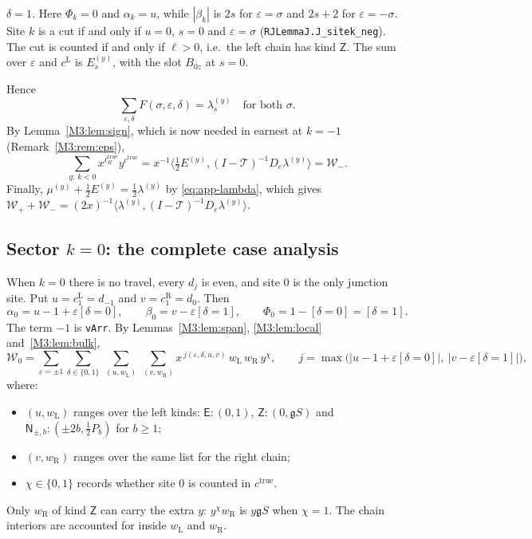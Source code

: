 \documentclass[11pt]{article}
\theoremstyle{plain}
\theoremstyle{definition}
\theoremstyle{remark}
\begin{document}
\emph{$\delta=1$.} Here $\Phi_k=0$ and $\alpha_k=u$, while $|\beta_k|$ is $2s$ for
$\varepsilon=\sigma$ and $2s+2$ for $\varepsilon=-\sigma$. Site $k$ is a cut if and only if
$u=0$, $s=0$ and $\varepsilon=\sigma$ (\texttt{RJLemmaJ.J\_sitek\_neg}). The cut is counted
if and only if $\ell>0$, i.e.\ the left chain has kind $\mathsf Z$. The sum over
$\varepsilon$ and $c^{\mathrm L}$ is $E^{(y)}_s$, with the slot $B_{0z}$ at $s=0$.

Hence
\begin{equation}\label{eq:app-k-far}
  \sum_{\varepsilon,\delta}F(\sigma,\varepsilon,\delta)=\lambda^{(y)}_s\quad\text{for both }\sigma .
\end{equation}
By Lemma~\ref{M3:lem:sign}, which is now needed in earnest at $k=-1$ (Remark~\ref{M3:rem:eps}),
\[
  \sum_{g:\,k<0}x^{\ell_R^{\mathrm{true}}}y^{c^{\mathrm{true}}}
  =x^{-1}\bigl\langle\tfrac12E^{(y)},(I-\mathcal T)^{-1}D_e\lambda^{(y)}\bigr\rangle=\mathcal W_- .
\]
Finally, $\mu^{(y)}+\tfrac12E^{(y)}=\tfrac12\lambda^{(y)}$ by \eqref{eq:app-lambda}, which gives
$\mathcal W_++\mathcal W_-=(2x)^{-1}\langle\lambda^{(y)},(I-\mathcal T)^{-1}D_e\lambda^{(y)}\rangle$.

\subsection{Sector $k=0$: the complete case analysis}\label{app:k0}

When $k=0$ there is no travel, every $d_j$ is even, and site $0$ is the only junction site.
Put $u=c^{\mathrm L}_1=d_{-1}$ and $v=c^{\mathrm R}_1=d_0$. Then
\[
  \alpha_0=u-1+\varepsilon[\delta=0],\qquad \beta_0=v-\varepsilon[\delta=1],\qquad
  \Phi_0=1-[\delta=0]=[\delta=1].
\]
The term $-1$ is \texttt{vArr}. By Lemmas~\ref{M3:lem:span}, \ref{M3:lem:local} and~\ref{M3:lem:bulk},
\begin{equation}\label{eq:app-W0}
  \mathcal W_0=\sum_{\varepsilon=\pm1}\sum_{\delta\in\{0,1\}}\ \sum_{(u,w_{\mathrm L})}\ \sum_{(v,w_{\mathrm R})}
  x^{\,j(\varepsilon,\delta,u,v)}\,w_{\mathrm L}\,w_{\mathrm R}\,y^{\chi},
  \qquad j=\max\bigl(|u-1+\varepsilon[\delta=0]|,\ |v-\varepsilon[\delta=1]|\bigr),
\end{equation}
where:
\begin{itemize}
\item $(u,w_{\mathrm L})$ ranges over the left kinds: $\mathsf E:(0,1)$,
  $\mathsf Z:(0,\mathfrak gS)$ and $\mathsf N_{\pm,b}:(\pm2b,\tfrac12P_b)$ for $b\ge1$;
\item $(v,w_{\mathrm R})$ ranges over the same list for the right chain;
\item $\chi\in\{0,1\}$ records whether site $0$ is counted in $c^{\mathrm{true}}$.
\end{itemize}
Only $w_{\mathrm R}$ of kind $\mathsf Z$ can carry the extra $y$: $y^\chi w_{\mathrm R}$ is
$y\mathfrak gS$ when $\chi=1$. The chain interiors are accounted for inside $w_{\mathrm L}$ and $w_{\mathrm R}$.
\end{document}
